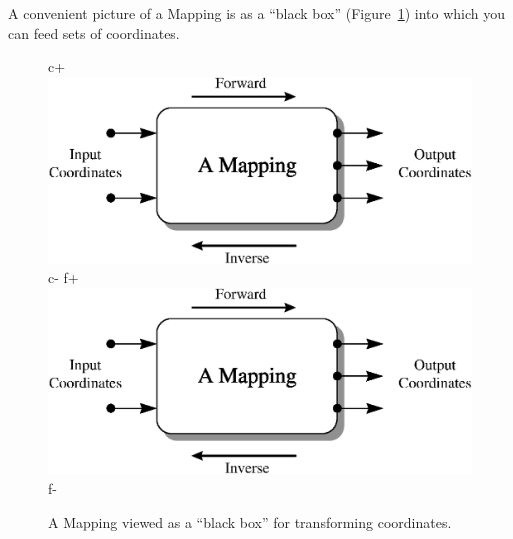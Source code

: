 \documentclass[twoside,11pt]{article}
\newenvironment{latexonly}{}{}
\begin{document}
\begin{latexonly}
   A convenient picture of a Mapping is as a ``black box''
   (Figure~\ref{fig:mapping}) into which you can feed sets of
   coordinates.
   \begin{figure}[bhtp]
   \begin{center}
c+
   \includegraphics[scale=0.7]{sun211_figures/mapping.eps}
c-
f+
   \includegraphics[scale=0.7]{sun210_figures/mapping.eps}
f-
   \caption{A Mapping viewed as a ``black box'' for transforming coordinates.}
   \label{fig:mapping}
   \end{center}
   \end{figure}
\end{latexonly}
\end{document}
